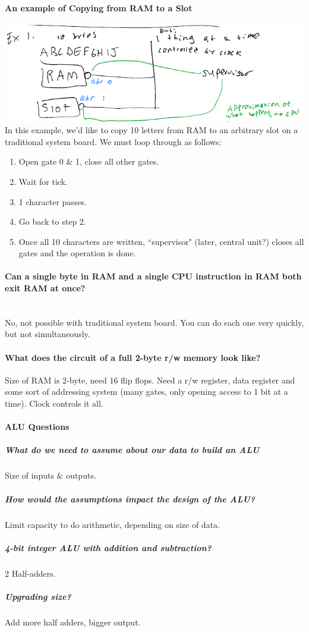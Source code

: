 \documentclass[12 pt]{article}
\begin{document}
	\paragraph{An example of Copying from RAM to a Slot}
	\includegraphics[scale=0.5]{rmstr.png}
	In this example, we'd like to copy 10 letters from RAM to an arbitrary slot on a traditional system board. We must loop through as follows:
	\begin{enumerate}
		\item Open gate 0 \& 1, close all other gates.
		\item Wait for tick.
		\item 1 character passes.
		\item Go back to step 2.
		\item Once all 10 characters are written, ``supervisor" (later, central unit?) closes all gates and the operation is done.
		\end{enumerate}
		\paragraph{Can a single byte in RAM and a single CPU instruction in RAM both exit RAM at once?}
		~\\ No, not possible with traditional system board. You can do each one very quickly, but not simultaneously.
		\paragraph{What does the circuit of a full 2-byte r/w memory look like?}
		Size of RAM is 2-byte, need 16 flip flops. Need a r/w register, data register and some sort of addressing system (many gates, only opening access to 1 bit at a time). Clock controls it all.
		\paragraph{ALU Questions}
		\subparagraph{What do we need to assume about our data to build an ALU}
		Size of inputs \& outputs.
		\subparagraph{How would the assumptions impact the design of the ALU?} Limit capacity to do arithmetic, depending on size of data.
		\subparagraph{4-bit integer ALU with addition and subtraction?} 2 Half-adders.
		\subparagraph{Upgrading size?} Add more half adders, bigger output.
\end{document}
